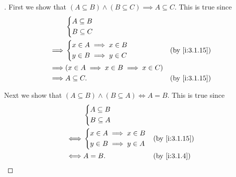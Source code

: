 \begin{proof}[]
  First we show that \((A \subseteq B) \land (B \subseteq C) \implies A \subseteq C\).
  This is true since
  \begin{align*}
             & \begin{dcases}
                 A \subseteq B \\
                 B \subseteq C
               \end{dcases}                                                  \\
    \implies & \begin{dcases}
                 x \in A \implies x \in B \\
                 y \in B \implies y \in C
               \end{dcases}                 &  & \by{i:3.1.15}                \\
    \implies & (x \in A \implies x \in B \implies x \in C)                    \\
    \implies & A \subseteq C.                              &  & \by{i:3.1.15}
  \end{align*}

  Next we show that \((A \subseteq B) \land (B \subseteq A) \iff A = B\).
  This is true since
  \begin{align*}
         & \begin{dcases}
             A \subseteq B \\
             B \subseteq A
           \end{dcases}                                 \\
    \iff & \begin{dcases}
             x \in A \implies x \in B \\
             y \in B \implies y \in A
           \end{dcases} &  & \by{i:3.1.15}               \\
    \iff & A = B.                      &  & \by{i:3.1.4}
  \end{align*}


\end{proof}
